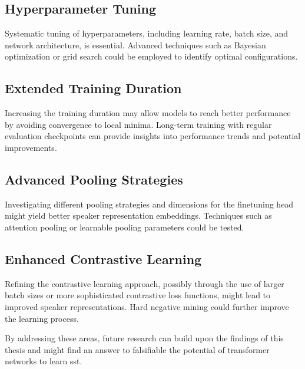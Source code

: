 \subsection{Hyperparameter Tuning}
Systematic tuning of hyperparameters, including learning rate, batch size, and network architecture, is essential. Advanced techniques such as Bayesian optimization or grid search could be employed to identify optimal configurations.

\subsection{Extended Training Duration}
Increasing the training duration may allow models to reach better performance by avoiding convergence to local minima. Long-term training with regular evaluation checkpoints can provide insights into performance trends and potential improvements.

\subsection{Advanced Pooling Strategies}
Investigating different pooling strategies and dimensions for the finetuning head might yield better speaker representation embeddings. Techniques such as attention pooling or learnable pooling parameters could be tested.

\subsection{Enhanced Contrastive Learning}
Refining the contrastive learning approach, possibly through the use of larger batch sizes or more sophisticated contrastive loss functions, might lead to improved speaker representations. Hard negative mining could further improve the learning process.

By addressing these areas, future research can build upon the findings of this thesis and might find an answer to falsifiable the potential of transformer networks to learn \gls{sst}.